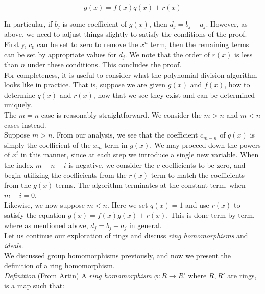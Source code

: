 \begin{displaymath}
g(x)=f(x)q(x)+r(x)
\end{displaymath}

In particular, if $b_{j}$ is some coefficient of $g(x)$, then $d_{j}=b_{j}-a_{j}$.  However, as above, we need to adjust things slightly to satisfy the conditions of the proof.  Firstly, $c_{0}$ can be set to zero to remove the $x^{n}$ term, then the remaining terms can be set by appropriate values for $d_{j}$.  We note that the order of $r(x)$ is less than $n$ under these conditions.  This concludes the proof.\\

For completeness, it is useful to consider what the polynomial division algorithm looks like in practice.  That is, suppose we are given $g(x)$ and $f(x)$, how to determine $q(x)$ and $r(x)$, now that we see they exist and can be determined uniquely.\\

The $m=n$ case is reasonably straightforward.  We consider the $m>n$ and $m<n$ cases instead.\\

Suppose $m>n$.  From our analysis, we see that the coefficient $c_{m-n}$ of $q(x)$ is simply the coefficient of the $x_{m}$ term in $g(x)$.  We may proceed down the powers of $x^{i}$ in this manner, since at each step we introduce a single new variable.  When the index $m-n-i$ is negative, we consider the $c$ coefficients to be zero, and begin utilizing the coefficients from the $r(x)$ term to match the coefficients from the $g(x)$ terms.  The algorithm terminates at the constant term, when $m-i=0$.\\  

Likewise, we now suppose $m<n$.  Here we set $q(x)=1$ and use $r(x)$ to satisfy the equation $g(x)=f(x)g(x)+r(x)$.  This is done term by term, where as mentioned above, $d_{j}=b_{j}-a_{j}$ in general.\\

Let us continue our exploration of rings and discuss \textit{ring homomorphisms} and \textit{ideals}.\\

We discussed group homomorphisms previously, and now we present the definition of a ring homomorphism.\\

\textit{Definition} (From Artin) A \textit{ring homomorphism} $\phi:R \longrightarrow R'$ where $R,R'$ are rings, is a map such that:

